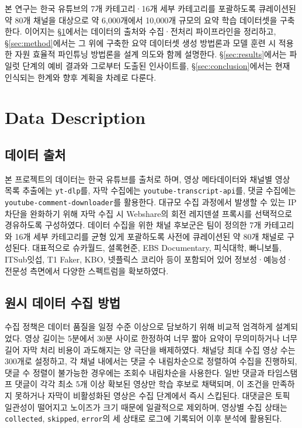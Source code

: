 \documentclass[11pt,a4paper]{article}
\begin{document}
본 연구는 한국 유튜브의 7개 카테고리·16개 세부 카테고리를 포괄하도록 큐레이션된 약 80개 채널을 대상으로 약 6{,}000개에서 10{,}000개 규모의 요약 학습 데이터셋을 구축한다. 이어지는 \S\ref{sec:data}에서는 데이터의 출처와 수집·전처리 파이프라인을 정리하고, \S\ref{sec:method}에서는 그 위에 구축한 요약 데이터셋 생성 방법론과 모델 훈련 시 적용한 자원 효율적 파인튜닝 방법론을 설계 의도와 함께 설명한다. \S\ref{sec:results}에서는 파일럿 단계의 예비 결과와 그로부터 도출된 인사이트를, \S\ref{sec:conclusion}에서는 현재 인식되는 한계와 향후 계획을 차례로 다룬다.

\section{Data Description}\label{sec:data}

\subsection{데이터 출처}

본 프로젝트의 데이터는 한국 유튜브를 출처로 하며, 영상 메타데이터와 채널별 영상 목록 추출에는 \texttt{yt-dlp}를, 자막 수집에는 \texttt{youtube-transcript-api}를, 댓글 수집에는 \texttt{youtube-comment-downloader}를 활용한다. 대규모 수집 과정에서 발생할 수 있는 IP 차단을 완화하기 위해 자막 수집 시 Webshare의 회전 레지덴셜 프록시를 선택적으로 경유하도록 구성하였다. 데이터 수집을 위한 채널 후보군은 팀이 정의한 7개 카테고리와 16개 세부 카테고리를 균형 있게 포괄하도록 사전에 큐레이션된 약 80개 채널로 구성된다. 대표적으로 슈카월드, 셜록현준, EBS Documentary, 피식대학, 빠니보틀, ITSub잇섭, T1 Faker, KBO, 넷플릭스 코리아 등이 포함되어 있어 정보성·예능성·전문성 측면에서 다양한 스펙트럼을 확보하였다.

\subsection{원시 데이터 수집 방법}

수집 정책은 데이터 품질을 일정 수준 이상으로 담보하기 위해 비교적 엄격하게 설계되었다. 영상 길이는 5분에서 30분 사이로 한정하여 너무 짧아 요약이 무의미하거나 너무 길어 자막 처리 비용이 과도해지는 양 극단을 배제하였다. 채널당 최대 수집 영상 수는 300개로 설정하고, 각 채널 내에서는 댓글 수 내림차순으로 정렬하여 수집을 진행하되, 댓글 수 정렬이 불가능한 경우에는 조회수 내림차순을 사용한다. 일반 댓글과 타임스탬프 댓글이 각각 최소 5개 이상 확보된 영상만 학습 후보로 채택되며, 이 조건을 만족하지 못하거나 자막이 비활성화된 영상은 수집 단계에서 즉시 스킵된다. 대댓글은 토픽 일관성이 떨어지고 노이즈가 크기 때문에 일괄적으로 제외하며, 영상별 수집 상태는 \texttt{collected}, \texttt{skipped}, \texttt{error}의 세 상태로 로그에 기록되어 이후 분석에 활용된다.
\end{document}
